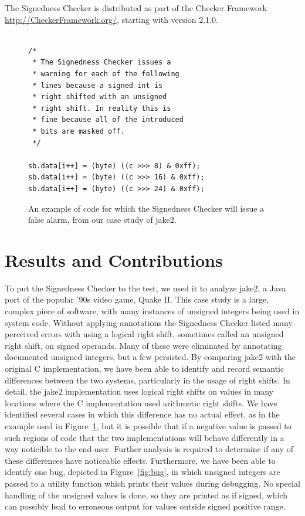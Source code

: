 \documentclass{sig-alternate-05-2015}
\def\<#1>{\codeid{#1}}
\begin{document}
The Signedness Checker is distributed as part of the Checker Framework
\url{http://CheckerFramework.org/}, starting with version 2.1.0.

\begin{figure}
\begin{lstlisting}

/*
 * The Signedness Checker issues a
 * warning for each of the following
 * lines because a signed int is
 * right shifted with an unsigned
 * right shift. In reality this is
 * fine because all of the introduced
 * bits are masked off.
 */

sb.data[i++] = (byte) ((c >>> 8) & 0xff);
sb.data[i++] = (byte) ((c >>> 16) & 0xff);
sb.data[i++] = (byte) ((c >>> 24) & 0xff);

\end{lstlisting}
\vspace{-10pt}
\caption{An example of code for which the Signedness Checker will issue a false
alarm, from our case study of jake2.}
\label{fig:false-alarm}
\end{figure}

\section{Results and Contributions}

To put the Signedness Checker to the test, we used it to analyze jake2, a Java
port of the popular '90s video game, Quake II. This case study is a large,
complex piece of software, with many instances of unsigned integers being used
in system code. Without applying annotations the Signedness Checker listed many
perceived errors with using a logical right shift, sometimes called an unsigned
right shift, on signed operands. Many of these were eliminated by annotating
documented unsigned integers, but a few persisted. By comparing jake2 with the
original C implementation, we have been able to identify and record semantic
differences between the two systems, particularly in the usage of right shifts.
In detail, the jake2 implementation uses logical right shifts on \<@Signed> values
in many locations where the C implementation used arithmetic right shifts. We have
identified several cases in which this difference has no actual effect, as in the
example used in Figure~\ref{fig:false-alarm}, but it
is possible that if a negative value is passed to such regions of code that the
two implementations will behave differently in a way noticible to the end-user.
Further analysis is required to determine if any of these differences have
noticeable effects. Furthermore, we have been able to identify one bug,
depicted in Figure~\ref{fig:bug}, in which
unsigned integers are passed to a utility function which prints their values during
debugging. No special handling of the unsigned values is done, so they are printed as
if signed, which can possibly lead to erroneous output for values outside signed
positive range.
\end{document}
